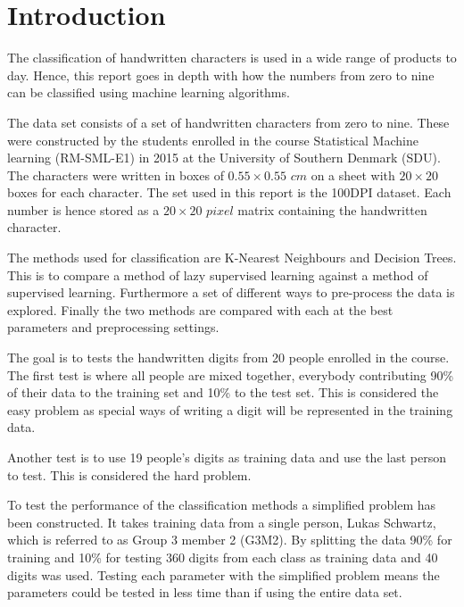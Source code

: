 \section{Introduction}

The classification of handwritten characters is used in a wide range of products to day.
Hence, this report goes in depth with how the numbers from zero to nine can be classified using machine learning algorithms.

The data set consists of a set of handwritten characters from zero to nine.
These were constructed by the students enrolled in the course Statistical Machine learning (RM-SML-E1) in 2015 at the University of Southern Denmark (SDU).
The characters were written in boxes of $0.55 \times 0.55 \textit{ cm}$ on a sheet with $20 \times 20$ boxes for each character.
The set used in this report is the 100DPI dataset.
Each number is hence stored as a $20 \times 20 \textit{ pixel}$ matrix containing the handwritten character.

The methods used for classification are K-Nearest Neighbours and Decision Trees.
This is to compare a method of lazy supervised learning against a method of supervised learning.
Furthermore a set of different ways to pre-process the data is explored.
Finally the two methods are compared with each at the best parameters and preprocessing settings.

The goal is to tests the handwritten digits from 20 people enrolled in the course.
The first test is where all people are mixed together, everybody contributing 90\% of their data to the training set and 10\% to the test set.
This is considered the easy problem as special ways of writing a digit will be represented in the training data.

Another test is to use 19 people's digits as training data and use the last person to test.
This is considered the hard problem.

To test the performance of the classification methods a simplified problem has been constructed.
It takes training data from a single person, Lukas Schwartz, which is referred to as Group 3 member 2 (G3M2).
By splitting the data 90\% for training and 10\% for testing
360 digits from each class as training data and 40 digits was used.
Testing each parameter with the simplified problem means the parameters could be tested in less time than if using the entire data set.
